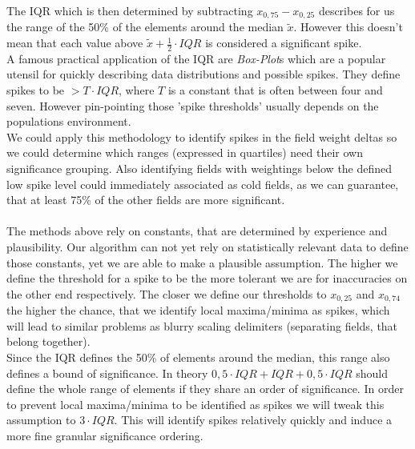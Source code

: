 The IQR which is then determined by subtracting $x_{0,75}-x_{0,25}$ describes for us the range of the 50\% of the elements around the median $\tilde{x}$. However this doesn't mean that each value above $\tilde{x}+\frac{1}{2}\cdot IQR$ is considered a significant spike.\\
A famous practical application of the IQR are \textit{Box-Plot}s  which are a popular utensil for quickly describing data distributions and possible spikes. They define spikes to be $> T\cdot IQR$, where $T$ is a constant that is often between four and seven. However pin-pointing those 'spike thresholds' usually depends on the populations environment.\\
We could apply this methodology to identify spikes in the field weight deltas so we could determine which ranges (expressed in quartiles) need their own significance grouping. Also identifying fields with weightings below the defined low spike level could immediately associated as cold fields, as we can guarantee, that at least 75\% of the other fields are more significant.\\\\
The methods above rely on constants, that are determined by experience and plausibility. Our algorithm can not yet rely on statistically relevant data to define those constants, yet we are able to make a plausible assumption. The higher we define the threshold for a spike to be the more tolerant we are for inaccuracies on the other end respectively. The closer we define our thresholds to $x_{0,25}$ and $x_{0,74}$ the higher the chance, that we identify local maxima/minima as spikes, which will lead to similar problems as blurry scaling delimiters (separating fields, that belong together).\\
Since the IQR defines the 50\% of elements around the median, this range also defines a bound of significance. In theory $0,5\cdot IQR+IQR+0,5\cdot IQR$ should define the whole range of elements if they share an order of significance. In order to prevent local maxima/minima to be identified as spikes we will tweak this assumption to $3\cdot IQR$. This will identify spikes relatively quickly and induce a more fine granular significance ordering.

